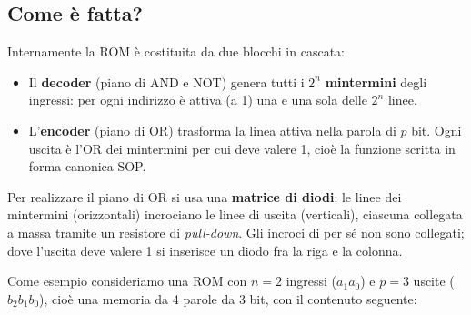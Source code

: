 \subsection{Come è fatta?}

Internamente la ROM è costituita da due blocchi in cascata:

\begin{center}
\end{center}

\begin{itemize}[leftmargin=1.5em, itemsep=2pt]
    \item Il \textbf{decoder} (piano di AND e NOT) genera tutti i $2^n$ \textbf{mintermini} degli
          ingressi: per ogni indirizzo è attiva (a 1) una e una sola delle $2^n$ linee.
    \item L'\textbf{encoder} (piano di OR) trasforma la linea attiva nella parola di $p$ bit.
          Ogni uscita è l'OR dei mintermini per cui deve valere 1, cioè la funzione scritta in
          forma canonica SOP.
\end{itemize}

\noindent Per realizzare il piano di OR si usa una \textbf{matrice di diodi}: le linee dei
mintermini (orizzontali) incrociano le linee di uscita (verticali), ciascuna collegata a massa
tramite un resistore di \emph{pull-down}. Gli incroci di per sé non sono collegati; dove
l'uscita deve valere 1 si inserisce un diodo fra la riga e la colonna.

\medskip
\noindent Come esempio consideriamo una ROM con $n=2$ ingressi ($a_1a_0$) e $p=3$ uscite
($b_2b_1b_0$), cioè una memoria da 4 parole da 3 bit, con il contenuto seguente:

